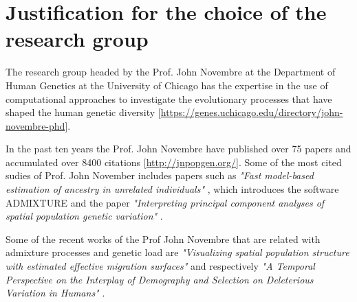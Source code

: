 \documentclass[a4paper, 12pt]{article}
\begin{document}
\section*{Justification for the choice of the research group}

The research group headed by the Prof. John Novembre at the Department of
Human Genetics at the University of Chicago has the expertise in the use of
computational approaches to investigate the evolutionary processes that have
shaped the human genetic diversity
[{\footnotesize \url{https://genes.uchicago.edu/directory/john-novembre-phd}}]. 

In the past ten years the Prof. John Novembre have published over 75 papers and
accumulated over 8400 citations [{\footnotesize \url{http://jnpopgen.org/}}].
Some of the most cited sudies of Prof. John November includes papers such as
\textit{"Fast model-based estimation of ancestry in unrelated individuals"}
\citep{Alexander2009}, which introduces the software ADMIXTURE and the paper
\textit{"Interpreting principal component analyses of spatial population
  genetic variation"} \citep{Novembre2008}. 

Some of the recent works of the Prof John Novembre that are related with
admixture processes and genetic load are \textit{"Visualizing spatial
  population structure with estimated effective migration surfaces"}
\citep{Petkova2016} and respectively \textit{"A Temporal Perspective on the
  Interplay of Demography and Selection on Deleterious Variation in Humans"}
\citep{Koch2017a}.



\end{document}
